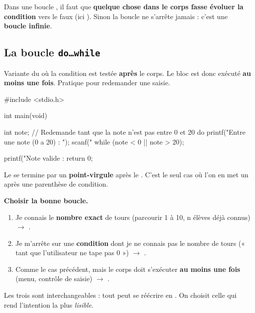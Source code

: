 
\begin{attention}
Dans une boucle , il faut que \textbf{quelque chose dans le corps fasse
évoluer la condition} vers le faux (ici ). Sinon la boucle ne s'arrête
jamais : c'est une \textbf{boucle infinie}.
\end{attention}

\subsection{La boucle \texttt{do\dots while}}

Variante du  où la condition est testée \textbf{après} le corps. Le bloc
est donc exécuté \textbf{au moins une fois}. Pratique pour redemander une saisie.

\begin{syntaxe}
\end{syntaxe}

\begin{codec}
#include <stdio.h>

int main(void) {
    int note;
    // Redemande tant que la note n'est pas entre 0 et 20
    do {
        printf("Entre une note (0 a 20) : ");
        scanf("%
    } while (note < 0 || note > 20);

    printf("Note valide : %
    return 0;
}
\end{codec}


\begin{attention}
Le  se termine par un \textbf{point-virgule} après le
. C'est le seul cas où l'on en met un après une parenthèse de
condition.
\end{attention}

\begin{methode}
\textbf{Choisir la bonne boucle.}
\begin{enumerate}[label=\arabic*)]
  \item Je connais le \textbf{nombre exact} de tours (parcourir 1 à 10, n élèves
    déjà connus) $\rightarrow$ .
  \item Je m'arrête sur une \textbf{condition} dont je ne connais pas le nombre de
    tours (« tant que l'utilisateur ne tape pas 0 ») $\rightarrow$ .
  \item Comme le cas précédent, mais le corps doit s'exécuter \textbf{au moins une
    fois} (menu, contrôle de saisie) $\rightarrow$ .
\end{enumerate}
Les trois sont interchangeables : tout  peut se réécrire en .
On choisit celle qui rend l'intention la plus \emph{lisible}.
\end{methode}

